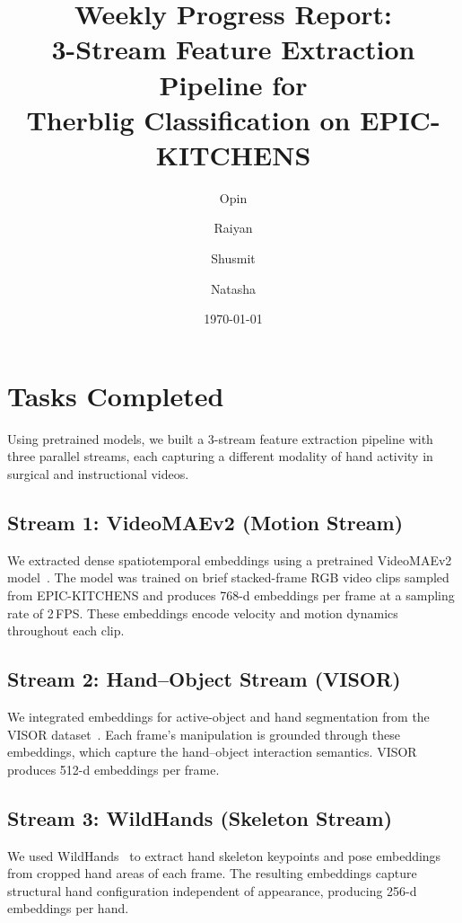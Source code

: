 \documentclass[11pt,a4paper]{article}
\title{Weekly Progress Report:\\3-Stream Feature Extraction Pipeline for\\Therblig Classification on EPIC-KITCHENS}
\author{
  Opin \and Raiyan \and Shusmit \and Natasha
}
\date{\today}
\begin{document}
\maketitle

\section{Tasks Completed}

Using pretrained models, we built a 3-stream feature extraction pipeline with three parallel streams, each capturing a different modality of hand activity in surgical and instructional videos.

\subsection{Stream 1: VideoMAEv2 (Motion Stream)}

We extracted dense spatiotemporal embeddings using a pretrained VideoMAEv2 model~\cite{videoMAEv2}. The model was trained on brief stacked-frame RGB video clips sampled from EPIC-KITCHENS and produces 768-d embeddings per frame at a sampling rate of 2\,FPS. These embeddings encode velocity and motion dynamics throughout each clip.

\subsection{Stream 2: Hand--Object Stream (VISOR)}

We integrated embeddings for active-object and hand segmentation from the VISOR dataset~\cite{visor}. Each frame's manipulation is grounded through these embeddings, which capture the hand--object interaction semantics. VISOR produces 512-d embeddings per frame.

\subsection{Stream 3: WildHands (Skeleton Stream)}

We used WildHands~\cite{wildhands} to extract hand skeleton keypoints and pose embeddings from cropped hand areas of each frame. The resulting embeddings capture structural hand configuration independent of appearance, producing 256-d embeddings per hand.
\end{document}
